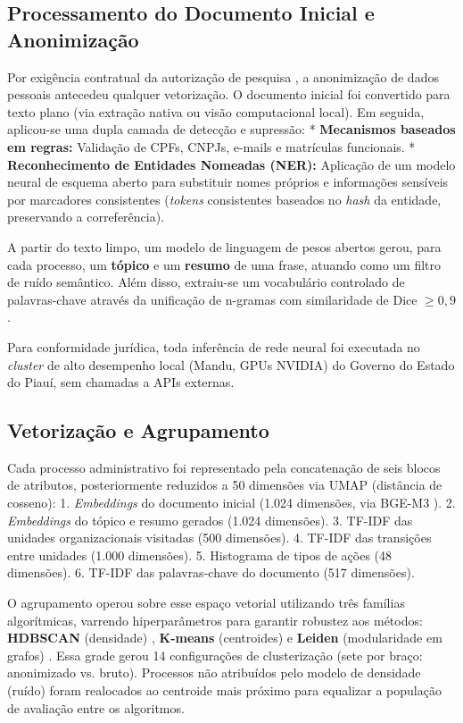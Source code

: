 \subsection{Processamento do Documento Inicial e Anonimização}\label{sec:documento}

Por exigência contratual da autorização de pesquisa \cite{seadpi2026termo}, a anonimização de dados pessoais antecedeu qualquer vetorização. O documento inicial foi convertido para texto plano (via extração nativa ou visão computacional local). Em seguida, aplicou-se uma dupla camada de detecção e supressão:
* \textbf{Mecanismos baseados em regras:} Validação de CPFs, CNPJs, e-mails e matrículas funcionais.
* \textbf{Reconhecimento de Entidades Nomeadas (NER):} Aplicação de um modelo neural de esquema aberto \cite{zaratiana2025gliner2} para substituir nomes próprios e informações sensíveis por marcadores consistentes (\emph{tokens} consistentes baseados no \emph{hash} da entidade, preservando a correferência).

A partir do texto limpo, um modelo de linguagem de pesos abertos gerou, para cada processo, um \textbf{tópico} e um \textbf{resumo} de uma frase, atuando como um filtro de ruído semântico. Além disso, extraiu-se um vocabulário controlado de palavras-chave através da unificação de n-gramas com similaridade de Dice $\geq 0,9$.

Para conformidade jurídica, toda inferência de rede neural foi executada no \emph{cluster} de alto desempenho local (Mandu, GPUs NVIDIA) do Governo do Estado do Piauí, sem chamadas a APIs externas.

\subsection{Vetorização e Agrupamento}\label{sec:atributos}

Cada processo administrativo foi representado pela concatenação de seis blocos de atributos, posteriormente reduzidos a 50 dimensões via UMAP \cite{mcinnes2018umap} (distância de cosseno):
1. \emph{Embeddings} do documento inicial (1.024 dimensões, via BGE-M3 \cite{chen2024bgem3}).
2. \emph{Embeddings} do tópico e resumo gerados (1.024 dimensões).
3. TF-IDF das unidades organizacionais visitadas (500 dimensões).
4. TF-IDF das transições entre unidades (1.000 dimensões).
5. Histograma de tipos de ações (48 dimensões).
6. TF-IDF das palavras-chave do documento (517 dimensões).

O agrupamento operou sobre esse espaço vetorial utilizando três famílias algorítmicas, varrendo hiperparâmetros para garantir robustez aos métodos: \textbf{HDBSCAN} (densidade) \cite{mcinnes2017hdbscan}, \textbf{K-means} (centroides) e \textbf{Leiden} (modularidade em grafos) \cite{traag2019leiden}. Essa grade gerou 14 configurações de clusterização (sete por braço: anonimizado vs. bruto). Processos não atribuídos pelo modelo de densidade (ruído) foram realocados ao centroide mais próximo para equalizar a população de avaliação entre os algoritmos.

